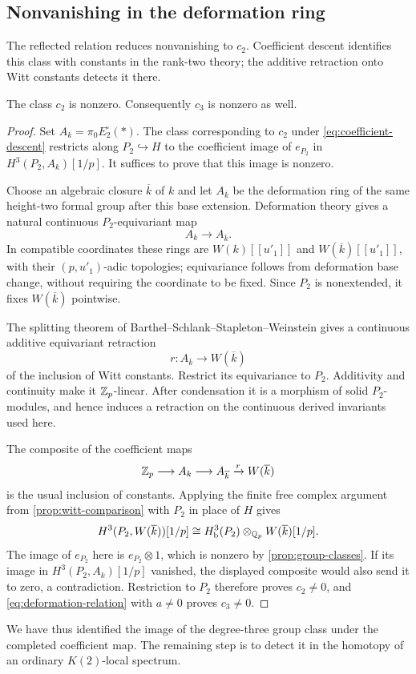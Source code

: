 \subsection{Nonvanishing in the deformation ring}

The reflected relation reduces nonvanishing to $c_2$. Coefficient
descent identifies this class with constants in the rank-two theory;
the additive retraction onto Witt constants detects it there.

\begin{lemma}\label{lem:constant-nonvanishing}
The class $c_2$ is nonzero.  Consequently $c_3$ is nonzero as well.
\end{lemma}

\begin{proof}
Set $A_k=\pi_0E_2^{\square}(*)$.  The class corresponding to $c_2$
under \eqref{eq:coefficient-descent} restricts along $P_2\hookrightarrow H$
to the coefficient image of $e_{P_2}$ in $H^3(P_2,A_k)[1/p]$.
It suffices to prove that this image is nonzero.

Choose an algebraic closure $\overline k$ of $k$ and let
$A_{\overline k}$ be the deformation ring of the same height-two
formal group after this base extension.  Deformation theory gives
a natural continuous $P_2$-equivariant map
\[
 A_k\longrightarrow A_{\overline k}.
\]
In compatible coordinates these rings are $W(k)[[u'_1]]$ and
$W(\overline k)[[u'_1]]$, with their $(p,u'_1)$-adic topologies;
equivariance follows from deformation base change, without requiring
the coordinate to be fixed.  Since $P_2$ is nonextended, it fixes
$W(\overline k)$ pointwise.

The splitting theorem of Barthel--Schlank--Stapleton--Weinstein
\cite[Proposition~2.5.1 and Corollary~2.5.9]{BSSW2025} gives a
continuous additive equivariant retraction
\[
 r:A_{\overline k}\longrightarrow W(\overline k)
\]
of the inclusion of Witt constants. Restrict its equivariance to $P_2$.
Additivity and continuity make it $\mathbb Z_p$-linear. After condensation
it is a morphism of solid $P_2$-modules, and hence
induces a retraction on the continuous derived invariants used here.

The composite of the coefficient maps
\[
 \mathbb Z_p\longrightarrow A_k\longrightarrow A_{\overline k}
       \xrightarrow{r}W(\overline k)
\]
is the usual inclusion of constants.  Applying the finite free
complex argument from \cref{prop:witt-comparison} with $P_2$ in
place of $H$ gives
\[
 H^3(P_2,W(\overline k))[1/p]
   \cong H^3_{\mathrm b}(P_2)
          \otimes_{\mathbb Q_p}W(\overline k)[1/p].
\]
The image of $e_{P_2}$ here is $e_{P_2}\otimes1$, which is nonzero
by \cref{prop:group-classes}.  If its image in
$H^3(P_2,A_k)[1/p]$ vanished, the displayed composite would also
send it to zero, a contradiction.  Restriction to $P_2$ therefore
proves $c_2\ne0$, and \eqref{eq:deformation-relation} with $a\ne0$
proves $c_3\ne0$.
\end{proof}

We have thus identified the image of the degree-three group class
under the completed coefficient map.  The remaining step is to
detect it in the homotopy of an ordinary $K(2)$-local spectrum.
